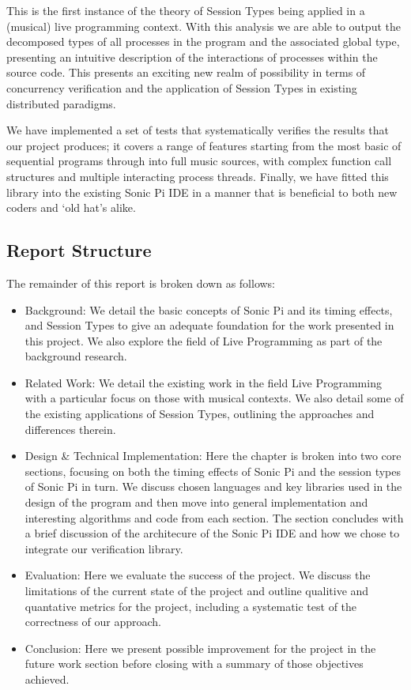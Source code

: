 \documentclass[11pt, abstracton, twoside, titlepage=true]{scrartcl}
\begin{document}
This is the first instance of the theory of Session Types being applied in 
a (musical) live programming context. With this analysis we are able to output 
the decomposed types of all processes in the program and the associated global 
type, presenting an intuitive description of the interactions of processes 
within the source code. This presents an exciting new realm of possibility in
terms of concurrency verification and the application of Session Types in 
existing distributed paradigms.

We have implemented a set of tests that systematically verifies the results that
our project produces; it covers a range of features starting from the most basic
of sequential programs through into full music sources, with complex function
call structures and multiple interacting process threads. Finally, we have fitted
this library into the existing Sonic Pi IDE in a manner that is beneficial to both
new coders and `old hat's alike. 

\subsection{Report Structure}
The remainder of this report is broken down as follows:

\begin{itemize}
	\item Background: We detail the basic concepts of Sonic Pi and its timing 
	effects, and Session Types to give an adequate foundation for the work 
	presented in this project. We also explore the field of Live Programming 
	as part of the background research.
	\item Related Work: We detail the existing work in the field Live Programming
	with a particular focus on those with musical contexts. We also detail some
	of the existing applications of Session Types, outlining the approaches and
	differences therein.
	\item Design \& Technical Implementation: Here the chapter is broken into
	two core sections, focusing on both the timing effects of Sonic Pi and
	the session types of Sonic Pi in turn. We discuss chosen languages and key
	libraries used in the design of the program and then move into general
	implementation and interesting algorithms and code from each section. The
	section concludes with a brief discussion of the architecure of the Sonic 
	Pi IDE and how we chose to integrate our verification library.
	\item Evaluation: Here we evaluate the success of the project. We discuss
	the limitations of the current state of the project and outline qualitive
	and quantative metrics for the project, including a systematic test of
	the correctness of our approach.
	\item Conclusion: Here we present possible improvement for the project in
	the future work section before closing with a summary of those objectives
	achieved.
\end{itemize}
\newpage
\end{document}
